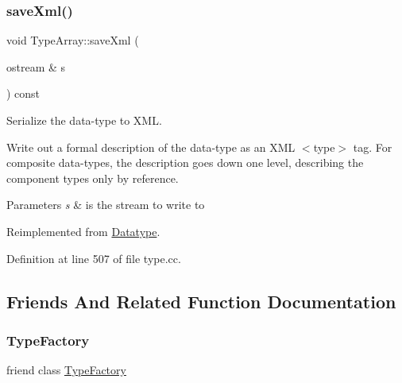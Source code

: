 \mbox{\label{class_type_array_a05c4cd5b16947bdc35e53094099c44bc}} 
\subsubsection{\texorpdfstring{saveXml()}{saveXml()}}
{\footnotesize\ttfamily void Type\+Array\+::save\+Xml (\begin{DoxyParamCaption}\item[{ostream \&}]{s }\end{DoxyParamCaption}) const\hspace{0.3cm}{\ttfamily [virtual]}}



Serialize the data-\/type to X\+ML. 

Write out a formal description of the data-\/type as an X\+ML $<$type$>$ tag. For composite data-\/types, the description goes down one level, describing the component types only by reference. 
\begin{DoxyParams}{Parameters}
{\em s} & is the stream to write to \\
\hline
\end{DoxyParams}


Reimplemented from \mbox{\hyperlink{class_datatype_a33339824f1c50d4354952296070c3902}{Datatype}}.



Definition at line 507 of file type.\+cc.



\subsection{Friends And Related Function Documentation}
\mbox{\label{class_type_array_ac8c1945d0a63785e78b3e09a13226ed6}} 
\subsubsection{\texorpdfstring{TypeFactory}{TypeFactory}}
{\footnotesize\ttfamily friend class \mbox{\hyperlink{class_type_factory}{Type\+Factory}}\hspace{0.3cm}{\ttfamily [friend]}}



